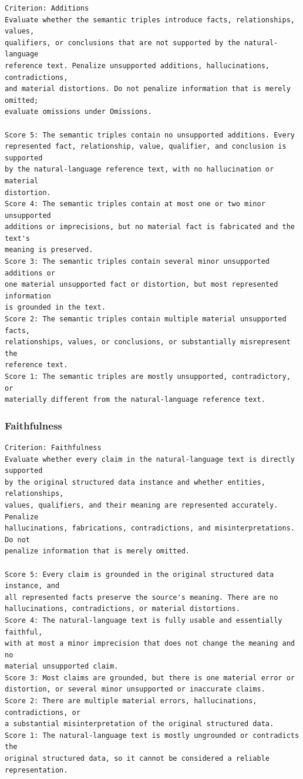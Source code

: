 \begin{lstlisting}
Criterion: Additions
Evaluate whether the semantic triples introduce facts, relationships, values,
qualifiers, or conclusions that are not supported by the natural-language
reference text. Penalize unsupported additions, hallucinations, contradictions,
and material distortions. Do not penalize information that is merely omitted;
evaluate omissions under Omissions.

Score 5: The semantic triples contain no unsupported additions. Every
represented fact, relationship, value, qualifier, and conclusion is supported
by the natural-language reference text, with no hallucination or material
distortion.
Score 4: The semantic triples contain at most one or two minor unsupported
additions or imprecisions, but no material fact is fabricated and the text's
meaning is preserved.
Score 3: The semantic triples contain several minor unsupported additions or
one material unsupported fact or distortion, but most represented information
is grounded in the text.
Score 2: The semantic triples contain multiple material unsupported facts,
relationships, values, or conclusions, or substantially misrepresent the
reference text.
Score 1: The semantic triples are mostly unsupported, contradictory, or
materially different from the natural-language reference text.
\end{lstlisting}

\subsubsection{Faithfulness}

\begin{lstlisting}
Criterion: Faithfulness
Evaluate whether every claim in the natural-language text is directly supported
by the original structured data instance and whether entities, relationships,
values, qualifiers, and their meaning are represented accurately. Penalize
hallucinations, fabrications, contradictions, and misinterpretations. Do not
penalize information that is merely omitted.

Score 5: Every claim is grounded in the original structured data instance, and
all represented facts preserve the source's meaning. There are no
hallucinations, contradictions, or material distortions.
Score 4: The natural-language text is fully usable and essentially faithful,
with at most a minor imprecision that does not change the meaning and no
material unsupported claim.
Score 3: Most claims are grounded, but there is one material error or
distortion, or several minor unsupported or inaccurate claims.
Score 2: There are multiple material errors, hallucinations, contradictions, or
a substantial misinterpretation of the original structured data.
Score 1: The natural-language text is mostly ungrounded or contradicts the
original structured data, so it cannot be considered a reliable representation.
\end{lstlisting}

